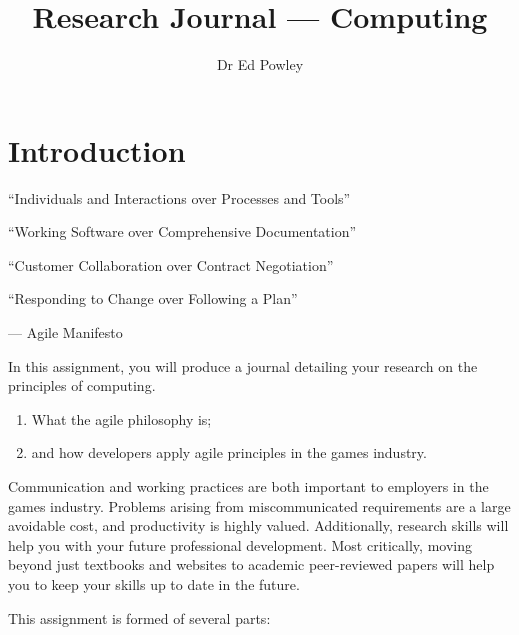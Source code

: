 \documentclass{../fal_assignment}
\title{Research Journal --- Computing}
\author{Dr Ed Powley}
\begin{document}
\maketitle

\section*{Introduction}

\begin{marginquote}
  ``Individuals and Interactions over Processes and Tools''
  
  ``Working Software over Comprehensive Documentation''
  
  ``Customer Collaboration over Contract Negotiation''
  
  ``Responding to Change over Following a Plan''
    
    --- Agile Manifesto
\end{marginquote}

In this assignment, you will produce a journal detailing your research on the principles of computing.

\begin{enumerate}[label=(\roman*)]
    \item What the agile philosophy is;
    \item and how developers apply agile principles in the games industry.
\end{enumerate}

Communication and working practices are both important to employers in the games industry. Problems arising from miscommunicated requirements are a large avoidable cost, and  productivity is highly valued. Additionally, research skills will help you with your future professional development. Most critically, moving beyond just textbooks and websites to academic peer-reviewed papers will help you to keep your skills up to date in the future.

This assignment is formed of several parts:
\end{document}
